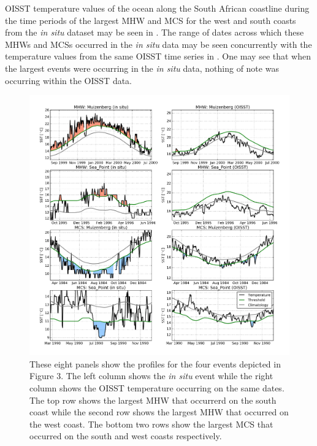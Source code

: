 \documentclass[a4paper,10pt,review]{elsarticle}
\begin{document}
OISST temperature values of the ocean along the South African coastline during the time periods of the largest MHW and MCS for the west and south coasts from the \emph{in situ} dataset may be seen in . The range of dates across which these MHWs and MCSs occurred in the \emph{in situ} data may be seen concurrently with the temperature values from the same OISST time series in . One may see that when the largest events were occurring in the \emph{in situ} data, nothing of note was occurring within the OISST data.


\begin{figure}
\centering \includegraphics[width=1.0\textwidth]{figure4.png}
\caption{These eight panels show the profiles for the four events depicted in Figure 3. The left column shows the \emph{in situ} event while the right column shows the OISST temperature occurring on the same dates. The top row shows the largest MHW that occurrerd on the south coast while the second row shows the largest MHW that occurred on the west coast. The bottom two rows show the largest MCS that occurred on the south and west coasts respectively.} \label{fig:Figure4}
\end{figure}
\end{document}
